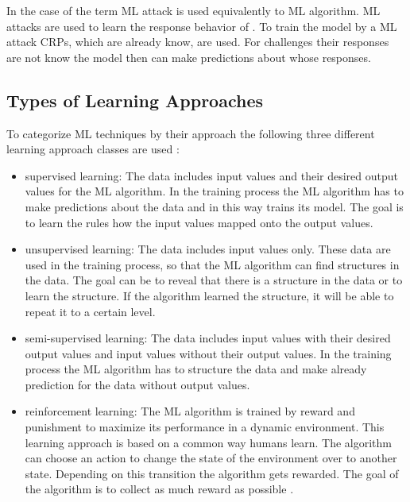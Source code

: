 In the case of \pufs the term \ac{ML} attack is used equivalently to \ac{ML} algorithm.
\ac{ML} attacks are used to learn the response behavior of \pufs. %
To train the model by a \ac{ML} attack \acp{CRP}, which are already know, are used.
For challenges their responses are not know the model then can make predictions about whose responses.


\subsection{Types of Learning Approaches}

To categorize \ac{ML} techniques by their approach the following three different learning approach classes are used \cite{Wikipedia2017MachineLearning}:

\begin{itemize}
\item supervised learning: The data includes input values and their desired output values for the \ac{ML} algorithm. 
In the training process the \ac{ML} algorithm has to make predictions about the data and in this way trains its model. %
The goal is to learn the rules how the input values mapped onto the output values.
\item unsupervised learning: The data includes input values only.
These data are used in the training process, so that the \ac{ML} algorithm can find structures in the data. %
The goal can be to reveal that there is a structure in the data or to learn the structure.
If the algorithm learned the structure, it will be able to repeat it to a certain level.
\item semi-supervised learning: The data includes input values with their desired output values and input values without their output values. %
In the training process the \ac{ML} algorithm has to structure the data and make already prediction for the data without output values.
\item reinforcement learning: The \ac{ML} algorithm is trained by reward and punishment to maximize its performance in a dynamic environment.
This learning approach is based on a common way humans learn. %
The algorithm can choose an action to change the state of the environment over to another state.
Depending on this transition the algorithm gets rewarded.
The goal of the algorithm is to collect as much reward as possible \cite{Wikipedia2017ReinforcementLearning}.
\end{itemize}


